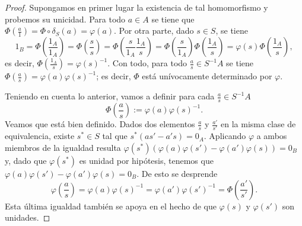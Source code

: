 \documentclass[../main.tex]{subfiles}
\begin{document}
\begin{proof}
Supongamos en primer lugar la existencia de tal homomorfismo y probemos su unicidad. Para todo $a\in A$ se tiene que $\Phi(\frac{a}{1})=\Phi\circ\delta_S(a)=\varphi(a)$. Por otra parte, dado $s\in S$, se tiene
$$1_B=\Phi\left(\frac{1_A}{1_A}\right)=\Phi\left(\frac{s}{s}\right)=\Phi\left(\frac{s}{1_A}\frac{1_A}{s}\right)=\Phi\left(\frac{s}{1_A}\right)\Phi\left(\frac{1_A}{s}\right)=\varphi(s)\Phi\left(\frac{1_A}{s}\right),$$
es decir, $\Phi(\frac{1_A}{s})={\varphi(s)}^{-1}$. Con todo, para todo $\frac{a}{s}\in S^{-1}A$ se tiene $\Phi(\frac{a}{s})=\varphi(a){\varphi(s)}^{-1}$; es decir, $\Phi$ está unívocamente determinado por $\varphi$.

Teniendo en cuenta lo anterior, vamos a definir para cada $\frac{a}{s}\in S^{-1}A$ 
$$\Phi\left(\frac{a}{s}\right):=\varphi(a){\varphi(s)}^{-1}.$$
Veamos que está bien definido. Dados dos elementos $\frac{a}{s}$ y $\frac{a'}{s'}$ en la misma clase de equivalencia, existe $s^*\in S$ tal que $s^*(as'-a's)=0_A$. Aplicando $\varphi$ a ambos miembros de la igualdad resulta $\varphi(s^*)(\varphi(a)\varphi(s')-\varphi(a')\varphi(s))=0_B$ y, dado que $\varphi(s^*)$ es unidad por hipótesis, tenemos que $\varphi(a)\varphi(s')-\varphi(a')\varphi(s)=0_B$. De esto se desprende
$$\varphi\left(\frac{a}{s}\right)=\varphi(a){\varphi(s)}^{-1}=\varphi(a'){\varphi(s')}^{-1}=\Phi\left(\frac{a'}{s'}\right).$$
Esta última igualdad también se apoya en el hecho de que $\varphi(s)$ y $\varphi(s')$ son unidades.
\end{proof}
\end{document}
